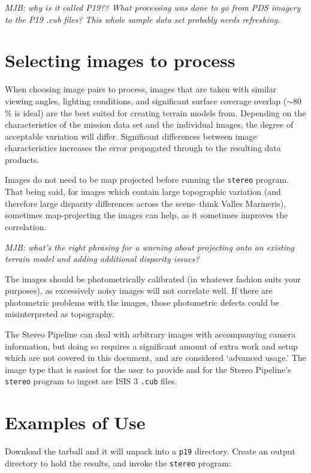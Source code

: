 \emph{MJB: why is it called P19??  What processing was done to go from PDS imagery to the P19 .cub files?  This whole sample data set probably needs refreshing.}


\section{Selecting images to process}

When choosing image pairs to process, images that are taken with
similar viewing angles, lighting conditions, and significant surface
coverage overlap ($\sim80$\% is ideal) are the best suited for
creating terrain models from. Depending on the characteristics of
the mission data set and the individual images, the degree of
acceptable variation will differ. Significant differences between
image characteristics increases the error propagated through to the
resulting data products.

Images do not need to be map projected before running the \texttt{stereo}
program. That being said, for images which contain large topographic
variation (and therefore large disparity differences across the
scene--think Valles Marineris), sometimes map-projecting the images
can help, as it sometimes improves the correlation.

\emph{MJB: what's the right phrasing for a warning about projecting onto an existing terrain model and adding additional disparity issues?}

The images should be photometrically calibrated (in whatever fashion
suits your purposes), as excessively noisy images will not correlate
well.  If there are photometric problems with the images, those
photometric defects could be misinterpreted as topography.

The Stereo Pipeline can deal with arbitrary images with accompanying
camera information, but doing so requires a significant amount of
extra work and setup which are not covered in this document, and
are considered `advanced usage.'  The image type that is easiest
for the user to provide and for the Stereo Pipeline's \texttt{stereo}
program to ingest are ISIS 3 \texttt{.cub} files.



\section{Examples of Use}


Download the tarball and it will unpack into a \texttt{p19} directory.  Create an output directory to hold the results, and invoke the \texttt{stereo} program:


